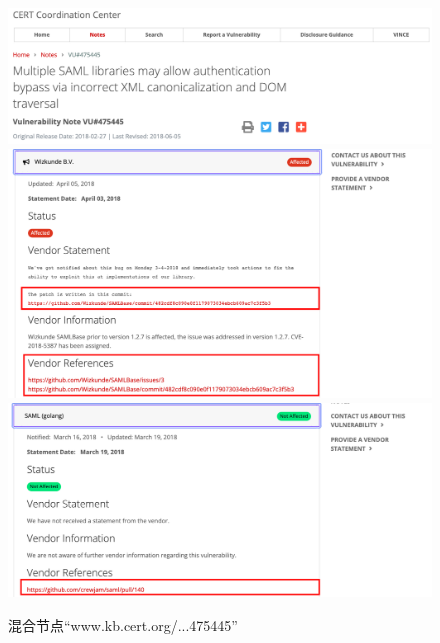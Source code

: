 \begin{figure}[!t]
    \centering
    \includegraphics[scale=0.35]{fig/457445-0}
    \includegraphics[scale=0.35]{fig/457445-1}
    \includegraphics[scale=0.35]{fig/457445-2}
    \caption{混合节点“www.kb.cert.org/...475445”}\label{fig:457445}
\end{figure}

